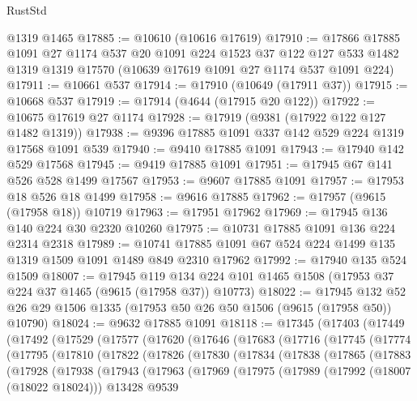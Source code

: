 \begin{lexlean}{RustStd}
\begin{coremodule}
    @1319
    @1465
@17885 := @10610 (@10616 @17619)
@17910 := @17866
    @17885
    @1091
    @27
    @1174
    @537
    @20
    @1091
    @224
    @1523
    @37
    @122
    @127
    @533
    @1482
    @1319
    @1319
    @17570
    (@10639 @17619 @1091 @27 @1174 @537 @1091 @224)
@17911 := @10661 @537
@17914 := @17910 (@10649 (@17911 @37))
@17915 := @10668 @537
@17919 := @17914 (@4644 (@17915 @20 @122))
@17922 := @10675 @17619 @27 @1174
@17928 := @17919 (@9381 (@17922 @122 @127 @1482 @1319))
@17938 := @9396 @17885 @1091 @337 @142 @529 @224 @1319 @17568 @1091 @539
@17940 := @9410 @17885 @1091
@17943 := @17940 @142 @529 @17568
@17945 := @9419 @17885 @1091
@17951 := @17945 @67 @141 @526 @528 @1499 @17567
@17953 := @9607 @17885 @1091
@17957 := @17953 @18 @526 @18 @1499
@17958 := @9616 @17885
@17962 := @17957 (@9615 (@17958 @18)) @10719
@17963 := @17951 @17962
@17969 := @17945 @136 @140 @224 @30 @2320 @10260
@17975 := @10731 @17885 @1091 @136 @224 @2314 @2318
@17989 := @10741 @17885 @1091 @67 @524 @224 @1499 @135 @1319 @1509 @1091 @1489 @849 @2310 @17962
@17992 := @17940 @135 @524 @1509
@18007 := @17945
    @119
    @134
    @224
    @101
    @1465
    @1508
    (@17953 @37 @224 @37 @1465 (@9615 (@17958 @37)) @10773)
@18022 := @17945 @132 @52 @26 @29 @1506 @1335 (@17953 @50 @26 @50 @1506 (@9615 (@17958 @50)) @10790)
@18024 := @9632 @17885 @1091
@18118 := @17345
    (@17403
      (@17449
        (@17492
          (@17529
            (@17577
              (@17620
                (@17646
                  (@17683
                    (@17716
                      (@17745
                        (@17774
                          (@17795
                            (@17810
                              (@17822
                                (@17826
                                  (@17830
                                    (@17834
                                      (@17838
                                        (@17865
                                          (@17883
                                            (@17928
                                              (@17938
                                                (@17943
                                                  (@17963
                                                    (@17969
                                                      (@17975
                                                        (@17989
                                                          (@17992 (@18007 (@18022 @18024)))
                                                          @13428
                                                          @9539

\end{coremodule}
\end{lexlean}
